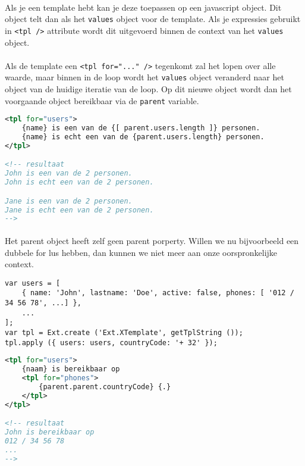 \paragraph {} Als je een template hebt kan je deze toepassen op een javascript object. Dit
object telt dan als het \lstinline{values} object voor de template. Als je expressies
gebruikt in \lstinline{<tpl />} attribute wordt dit uitgevoerd binnen de context van het
\lstinline{values} object.

\paragraph {} Als de template een \lstinline{<tpl for="..." />} tegenkomt zal het lopen
over alle waarde, maar binnen in de loop wordt het \lstinline{values} object veranderd
naar het object van de huidige iteratie van de loop. Op dit nieuwe object wordt dan het
voorgaande object bereikbaar via de \lstinline {parent} variable.

\begin{lstlisting}[language=xml]
<tpl for="users">
	{name} is een van de {[ parent.users.length ]} personen.
	{name} is echt een van de {parent.users.length} personen.
</tpl>

<!-- resultaat
John is een van de 2 personen.
John is echt een van de 2 personen.

Jane is een van de 2 personen.
Jane is echt een van de 2 personen.
-->
\end{lstlisting}

\paragraph {} Het parent object heeft zelf geen parent porperty. Willen we nu bijvoorbeeld
een dubbele for lus hebben, dan kunnen we niet meer aan onze oorspronkelijke context.

\begin{lstlisting}[language=ownjavascript]
var users = [
	{ name: 'John', lastname: 'Doe', active: false, phones: [ '012 / 34 56 78', ...] },
	...
];
var tpl = Ext.create ('Ext.XTemplate', getTplString ());
tpl.apply ({ users: users, countryCode: '+ 32' });
\end{lstlisting}

\begin{lstlisting}[language=xml]
<tpl for="users">
	{naam} is bereikbaar op
	<tpl for="phones">
		{parent.parent.countryCode} {.}
	</tpl>
</tpl>

<!-- resultaat
John is bereikbaar op
012 / 34 56 78
...
-->
\end{lstlisting}

